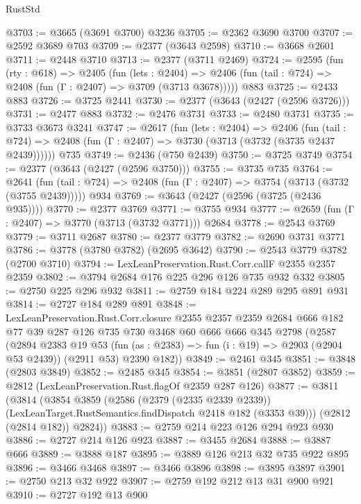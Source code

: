 \begin{lexlean}{RustStd}
\begin{coremodule}
@3703 := @3665 (@3691 @3700) @3236
@3705 := @2362 @3690 @3700
@3707 := @2592 @3689 @703
@3709 := @2377 (@3643 @2598)
@3710 := @3668 @2601
@3711 := @2448 @3710
@3713 := @2377 (@3711 @2469)
@3724 := @2595
    (fun (rty : @618) =>
    @2405
      (fun (lets : @2404) =>
      @2406 (fun (tail : @724) => @2408 (fun (Γ : @2407) => @3709 (@3713 @3678)))))
    @883
@3725 := @2433 @883
@3726 := @3725 @2441
@3730 := @2377 (@3643 (@2427 (@2596 @3726)))
@3731 := @2477 @883
@3732 := @2476 @3731
@3733 := @2480 @3731
@3735 := @3733 @3673 @3241
@3747 := @2617
    (fun (lets : @2404) =>
    @2406
      (fun (tail : @724) => @2408 (fun (Γ : @2407) => @3730 (@3713 (@3732 (@3735 @2437 @2439))))))
    @735
@3749 := @2436 (@750 @2439)
@3750 := @3725 @3749
@3754 := @2377 (@3643 (@2427 (@2596 @3750)))
@3755 := @3735 @735
@3764 := @2641
    (fun (tail : @724) => @2408 (fun (Γ : @2407) => @3754 (@3713 (@3732 (@3755 @2439)))))
    @934
@3769 := @3643 (@2427 (@2596 (@3725 (@2436 @935))))
@3770 := @2377 @3769
@3771 := @3755 @934
@3777 := @2659 (fun (Γ : @2407) => @3770 (@3713 (@3732 @3771))) @2684
@3778 := @2543 @3769
@3779 := @3711 @2687
@3780 := @2377 @3779
@3782 := @2690 @3731 @3771
@3786 := @3778 (@3780 @3782) (@2695 @3642)
@3790 := @2543 @3779 @3782 (@2700 @3710)
@3794 := LexLeanPreservation.Rust.Corr.callF @2355 @2357 @2359
@3802 := @3794 @2684 @176 @225 @296 @126 @735 @932 @332
@3805 := @2750 @225 @296 @932
@3811 := @2759 @184 @224 @289 @295 @891 @931
@3814 := @2727 @184 @289 @891
@3848 := LexLeanPreservation.Rust.Corr.closure
    @2355
    @2357
    @2359
    @2684
    @666
    @182
    @77
    @39
    @287
    @126
    @735
    @730
    @3468
    @60
    @666
    @666
    @345
    @2798
    (@2587
      (@2894
        @2383
        @19
        @53
        (fun (as : @2383) => fun (i : @19) => @2903 (@2904 @53 @2439))
        (@2911 @53)
        @2390
        @182))
@3849 := @2461 @345
@3851 := @3848 (@2803 @3849)
@3852 := @2485 @345
@3854 := @3851 (@2807 @3852)
@3859 := @2812 (LexLeanPreservation.Rust.flagOf @2359 @287 @126)
@3877 := @3811
    (@3814
      (@3854
        @3859
        (@2586
          (@2379 (@2335 @2339 @2339))
          (LexLeanTarget.RustSemantics.findDispatch @2418 @182 (@3353 @39)))
        (@2812 (@2814 @182))
        @2824))
@3883 := @2759 @214 @223 @126 @294 @923 @930
@3886 := @2727 @214 @126 @923
@3887 := @3455 @2684
@3888 := @3887 @666
@3889 := @3888 @187
@3895 := @3889 @126 @213 @32 @735 @922 @895
@3896 := @3466 @3468
@3897 := @3466 @3896
@3898 := @3895 @3897
@3901 := @2750 @213 @32 @922
@3907 := @2759 @192 @212 @13 @31 @900 @921
@3910 := @2727 @192 @13 @900

\end{coremodule}
\end{lexlean}

